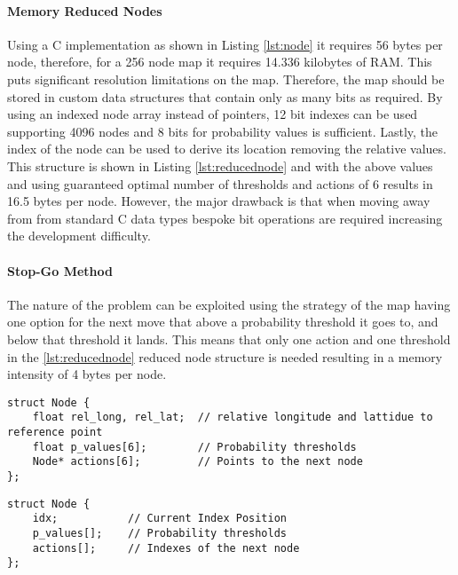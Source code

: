 \paragraph{Memory Reduced Nodes}
Using a C implementation as shown in Listing \ref{lst:node} it requires 56 bytes per node, therefore, for a 256 node map it requires 14.336 kilobytes of \gls{RAM}. This puts significant resolution limitations on the map. Therefore, the map should be stored in custom data structures that contain only as many bits as required. By using an indexed node array instead of pointers, 12 bit indexes can be used supporting 4096 nodes and 8 bits for probability values is sufficient. Lastly, the index of the node can be used to derive its location removing the relative values. This structure is shown in Listing \ref{lst:reducednode} and with the above values and using guaranteed optimal number of thresholds and actions of 6 results in 16.5 bytes per node. However, the major drawback is that when moving away from from standard C data types bespoke bit operations are required increasing the development difficulty. 
\paragraph{Stop-Go Method}
The nature of the problem can be exploited using the strategy of the map having one option for the next move that above a probability threshold it goes to, and below that threshold it lands. This means that only one action and one threshold in the \ref{lst:reducednode} reduced node structure is needed resulting in a memory intensity of 4 bytes per node.
\begin{lstlisting}[caption={Implementated Node Structure},label={lst:node}]
struct Node {
    float rel_long, rel_lat;  // relative longitude and lattidue to reference point
    float p_values[6];        // Probability thresholds
    Node* actions[6];         // Points to the next node
};
\end{lstlisting}
\begin{lstlisting}[caption={Node Structure},label={lst:reducednode}]
struct Node {
    idx;           // Current Index Position
    p_values[];    // Probability thresholds
    actions[];     // Indexes of the next node
};
\end{lstlisting}

